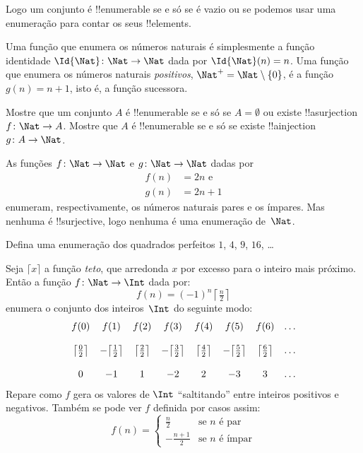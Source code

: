 \documentclass[../../../include/open-logic-section]{subfiles}
\begin{document}
\begin{explain}
Logo um conjunto é !!{enumerable} se e só se é vazio ou se podemos usar uma
enumeração para contar os seus !!{element}s.
\end{explain}

\begin{ex}
Uma função que enumera os números naturais é simplesmente a função identidade
$\Id{\Nat} \colon \Nat \to \Nat$ dada por $\Id{\Nat}(n) = n$. Uma função que
enumera os números naturais \emph{positivos}, $\Nat^+ =
\Nat \setminus \{0\}$, é a função $g(n) = n + 1$, isto é, a função sucessora.
\end{ex}

\begin{prob}
Mostre que um conjunto $A$ é !!{enumerable} se e só se $A = \emptyset$ ou existe
!!a{surjection} $f\colon \Nat \to A$. Mostre que $A$ é !!{enumerable} se e só se
existe !!a{injection} $g\colon A \to \Nat$.
\end{prob}

\begin{ex}
As funções $f\colon \Nat \to \Nat$ e $g \colon \Nat \to \Nat$ dadas por
\begin{align*}
  f(n) & = 2n \text{ e}\\
  g(n) & = 2n+1
\end{align*}
enumeram, respectivamente, os números naturais pares e os ímpares. Mas nenhuma é
!!{surjective}, logo nenhuma é uma enumeração de~$\Nat$.
\end{ex}

\begin{prob}
Defina uma enumeração dos quadrados perfeitos $1$, $4$, $9$, $16$, \dots
\end{prob}

\begin{ex}
Seja $\lceil x \rceil$ a função \emph{teto}, que arredonda $x$ por excesso para
o inteiro mais próximo. Então a função $f \colon \Nat \to \Int$ dada por:
\[
  f(n) = (-1)^{n} \left\lceil\tfrac{n}{2}\right\rceil
\]
enumera o conjunto dos inteiros~$\Int$ do seguinte modo:
\[
\begin{array}{c c c c c c c c}
f(0) & f(1) & f(2) & f(3) & f(4) & f(5) & f(6) & \dots \\ \\
\big\lceil \tfrac{0}{2} \big\rceil & -\big\lceil \tfrac{1}{2}\big\rceil &  \big\lceil \tfrac{2}{2} \big\rceil & -\big\lceil \tfrac{3}{2} \big\rceil & \big\lceil \tfrac{4}{2} \big\rceil  & -\big\lceil \tfrac{5}{2}\big\rceil & \big\lceil \tfrac{6}{2} \big\rceil & \dots \\ \\
0 & -1 & 1 & -2 & 2 & -3 & 3& \dots
\end{array}
\]
Repare como $f$ gera os valores de $\Int$ ``saltitando'' entre inteiros
positivos e negativos. Também se pode ver $f$ definida por casos assim:
\[
f(n) = \begin{cases}
  \frac{n}{2} & \text{se $n$ é par}\\
  -\frac{n+1}{2} & \text{se $n$ é ímpar}
  \end{cases}
\]
\end{ex}
\end{document}
